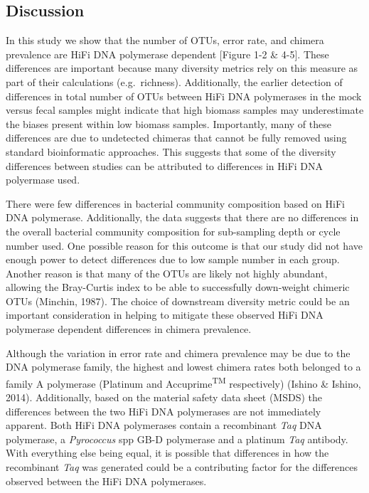 \documentclass[12pt,]{article}
\begin{document}
\newpage

\subsection{Discussion}\label{discussion}

In this study we show that the number of OTUs, error rate, and chimera
prevalence are HiFi DNA polymerase dependent {[}Figure 1-2 \& 4-5{]}.
These differences are important because many diversity metrics rely on
this measure as part of their calculations (e.g.~richness).
Additionally, the earlier detection of differences in total number of
OTUs between HiFi DNA polymerases in the mock versus fecal samples might
indicate that high biomass samples may underestimate the biases present
within low biomass samples. Importantly, many of these differences are
due to undetected chimeras that cannot be fully removed using standard
bioinformatic approaches. This suggests that some of the diversity
differences between studies can be attributed to differences in HiFi DNA
polyermase used.

There were few differences in bacterial community composition based on
HiFi DNA polymerase. Additionally, the data suggests that there are no
differences in the overall bacterial community composition for
sub-sampling depth or cycle number used. One possible reason for this
outcome is that our study did not have enough power to detect
differences due to low sample number in each group. Another reason is
that many of the OTUs are likely not highly abundant, allowing the
Bray-Curtis index to be able to successfully down-weight chimeric OTUs
(Minchin, 1987). The choice of downstream diversity metric could be an
important consideration in helping to mitigate these observed HiFi DNA
polymerase dependent differences in chimera prevalence.

Although the variation in error rate and chimera prevalence may be due
to the DNA polymerase family, the highest and lowest chimera rates both
belonged to a family A polymerase (Platinum and
Accuprime\textsuperscript{TM} respectively) (Ishino \& Ishino, 2014).
Additionally, based on the material safety data sheet (MSDS) the
differences between the two HiFi DNA polymerases are not immediately
apparent. Both HiFi DNA polymerases contain a recombinant \emph{Taq} DNA
polymerase, a \emph{Pyrococcus} spp GB-D polymerase and a platinum
\emph{Taq} antibody. With everything else being equal, it is possible
that differences in how the recombinant \emph{Taq} was generated could
be a contributing factor for the differences observed between the HiFi
DNA polymerases.
\end{document}
